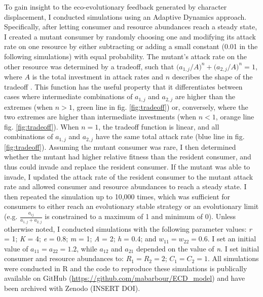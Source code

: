 \documentclass[11pt,]{article}
\begin{document}
To gain insight to the eco-evolutionary feedback generated by character
displacement, I conducted simulations using an Adaptive Dynamics
approach. Specifically, after letting consumer and resource abundances
reach a steady state, I created a mutant consumer by randomly choosing
one and modifying its attack rate on one resource by either subtracting
or adding a small constant (0.01 in the following simulations) with
equal probability. The mutant's attack rate on the other resource was
determined by a tradeoff, such that
\(\big(a_{\text{1},j}/{A}\big)^n+\big(a_{\text{2},j}/{A}\big)^n=1\),
where \(A\) is the total investment in attack rates and \(n\) describes
the shape of the tradeoff \citep{Sargent2006}. This function has the
useful property that it differentiates between cases where intermediate
combinations of \(a_{\text{1},j}\) and \(a_{\text{2},j}\) are higher
than the extremes (when \(n>1\), green line in fig. \ref{fig:tradeoff})
or, conversely, where the two extremes are higher than intermediate
investments (when \(n<1\), orange line fig. \ref{fig:tradeoff}). When
\(n=1\), the tradeoff function is linear, and all combinations of
\(a_{\text{1},j}\) and \(a_{\text{2},j}\) have the same total attack
rate (blue line in fig. \ref{fig:tradeoff}). Assuming the mutant
consumer was rare, I then determined whether the mutant had higher
relative fitness than the resident consumer, and thus could invade and
replace the resident consumer. If the mutant was able to invade, I
updated the attack rate of the resident consumer to the mutant attack
rate and allowed consumer and resource abundances to reach a steady
state. I then repeated the simulation up to 10,000 times, which was
sufficient for consumers to either reach an evolutionary stable strategy
\citep[ESS,][]{Smith1973} or an evolutionary limit (e.g.
\(\frac{a_{ij}}{a_{\text{1},j}+a_{\text{2},j}}\) is constrained to a
maximum of 1 and minimum of 0). Unless otherwise noted, I conducted
simulations with the following parameter values: \emph{r} = 1; \emph{K}
= 4; \emph{e} = 0.8; \emph{m} = 1; \emph{A} = 2; \emph{h} = 0.4; and
\(w_{11} = w_{22} = 0.6\). I set an initial value of
\(a_{11} = a_{22} = 1.2\), while \(a_{12}\) and \(a_{21}\) depended on
the value of \emph{n}. I set initial consumer and resource abundances
to: \(R_1 = R_2 = 2\); \(C_1 = C_2 = 1\). All simulations were conducted
in R \citep{R} and the code to reproduce these simulations is publically
available on GitHub (\url{https://github.com/mabarbour/ECD_model}) and
have been archived with Zenodo (INSERT DOI).
\end{document}
